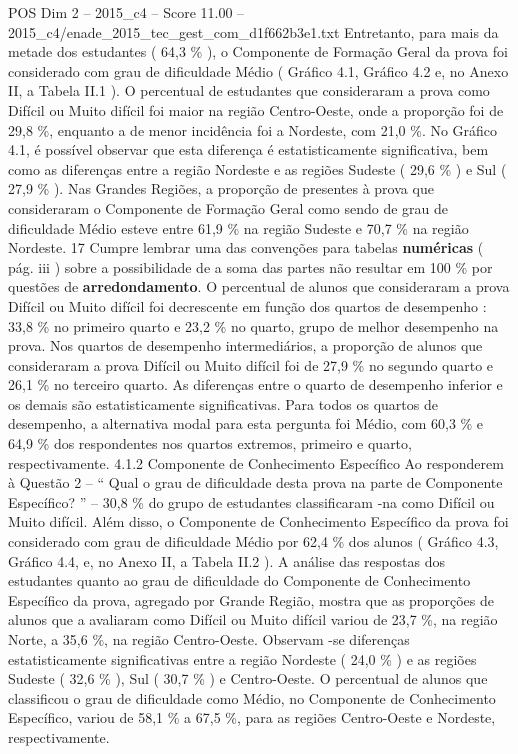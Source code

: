 \begin{textsample}{POS Dim 2 – 2015\_c4 – Score 11.00 – 2015\_c4/enade\_2015\_tec\_gest\_com\_d1f662b3e1.txt}
Entretanto, para mais da metade dos estudantes ( 64,3 \% ), o Componente de Formação Geral da prova foi considerado com grau de dificuldade Médio ( Gráfico 4.1, Gráfico 4.2 e, no Anexo II, a Tabela II.1 ).
O percentual de estudantes que consideraram a prova como Difícil ou Muito difícil foi maior na região Centro-Oeste, onde a proporção foi de 29,8 \%, enquanto a de menor incidência foi a Nordeste, com 21,0 \%.
No Gráfico 4.1, é possível observar que esta diferença é estatisticamente significativa, bem como as diferenças entre a região Nordeste e as regiões Sudeste ( 29,6 \% ) e Sul ( 27,9 \% ).
Nas Grandes Regiões, a proporção de presentes à prova que consideraram o Componente de Formação Geral como sendo de grau de dificuldade Médio esteve entre 61,9 \% na região Sudeste e 70,7 \% na região Nordeste. 17 Cumpre lembrar uma das convenções para tabelas \textbf{numéricas} ( pág. iii ) sobre a possibilidade de a soma das partes não resultar em 100 \% por questões de \textbf{arredondamento}.
O percentual de alunos que consideraram a prova Difícil ou Muito difícil foi decrescente em função dos quartos de desempenho : 33,8 \% no primeiro quarto e 23,2 \% no quarto, grupo de melhor desempenho na prova.
Nos quartos de desempenho intermediários, a proporção de alunos que consideraram a prova Difícil ou Muito difícil foi de 27,9 \% no segundo quarto e 26,1 \% no terceiro quarto.
As diferenças entre o quarto de desempenho inferior e os demais são estatisticamente significativas.
Para todos os quartos de desempenho, a alternativa modal para esta pergunta foi Médio, com 60,3 \% e 64,9 \% dos respondentes nos quartos extremos, primeiro e quarto, respectivamente. 4.1.2 Componente de Conhecimento Específico Ao responderem à Questão 2 – “ Qual o grau de dificuldade desta prova na parte de Componente Específico? ” – 30,8 \% do grupo de estudantes classificaram -na como Difícil ou Muito difícil.
Além disso, o Componente de Conhecimento Específico da prova foi considerado com grau de dificuldade Médio por 62,4 \% dos alunos ( Gráfico 4.3, Gráfico 4.4, e, no Anexo II, a Tabela II.2 ).
A análise das respostas dos estudantes quanto ao grau de dificuldade do Componente de Conhecimento Específico da prova, agregado por Grande Região, mostra que as proporções de alunos que a avaliaram como Difícil ou Muito difícil variou de 23,7 \%, na região Norte, a 35,6 \%, na região Centro-Oeste.
Observam -se diferenças estatisticamente significativas entre a região Nordeste ( 24,0 \% ) e as regiões Sudeste ( 32,6 \% ), Sul ( 30,7 \% ) e Centro-Oeste.
O percentual de alunos que classificou o grau de dificuldade como Médio, no Componente de Conhecimento Específico, variou de 58,1 \% a 67,5 \%, para as regiões Centro-Oeste e Nordeste, respectivamente.

\end{textsample}

